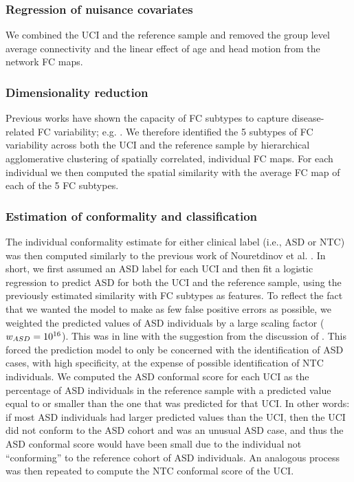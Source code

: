 \documentclass[9pt,lineno]{elife}
\begin{document}
\subsubsection{Regression of nuisance covariates}
We combined the UCI and the reference sample and removed the group level average connectivity and the linear effect of age and head motion from the network FC maps. 

\subsubsection{Dimensionality reduction}
Previous works have shown the capacity of FC subtypes to capture disease-related FC variability; e.g. \citep{Easson2019-zo}. We therefore identified the 5 subtypes of FC variability across both the UCI and the reference sample by hierarchical agglomerative clustering of spatially correlated, individual FC maps. For each individual we then computed the spatial similarity with the average FC map of each of the 5 FC subtypes.

\subsubsection{Estimation of conformality and classification}
The individual conformality estimate for either clinical label (i.e., ASD or NTC) was then computed similarly to the previous work of Nouretdinov et al. \citep{Nouretdinov2011-ph}. In short, we first assumed an ASD label for each UCI and then fit a logistic regression to predict ASD for both the UCI and the reference sample, using the previously estimated similarity with FC subtypes as features. To reflect the fact that we wanted the model to make as few false positive errors as possible, we weighted the predicted values of ASD individuals by a large scaling factor ($w_{ASD} = 10 \textsuperscript{16}$). This was in line with the suggestion from the discussion of \citet{Nouretdinov2011-ph}. This forced the prediction model to only be concerned with the identification of ASD cases, with high specificity, at the expense of possible identification of NTC individuals. We computed the ASD conformal score for each UCI as the percentage of ASD individuals in the reference sample with a predicted value equal to or smaller than the one that was predicted for that UCI. In other words: if most ASD individuals had larger predicted values than the UCI, then the UCI did not conform to the ASD cohort and was an unusual ASD case, and thus the ASD conformal score would have been small due to the individual not “conforming” to the reference cohort of ASD individuals. An analogous process was then repeated to compute the NTC conformal score of the UCI.
\end{document}
